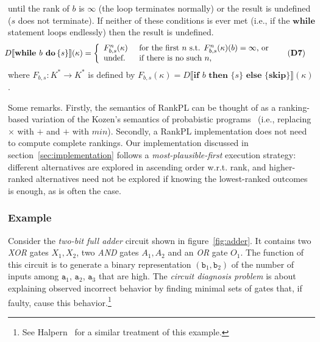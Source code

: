 \documentclass{llncs}
\newcommand{\dn}[1]{D\llbracket #1 \rrbracket}
\begin{document}
		until the rank of $b$ is $\infty$ (the loop terminates normally) or the result is undefined ($s$ does not terminate).
	If neither of these conditions is ever met (i.e., if the $\textbf{while}$ statement loops endlessly) then the result is undefined.
\begin{align}
\hspace{-5pt}\dn{\textbf{while }b\textbf{ do }\hspace{-2pt}\{ s \}}(\kappa) &=
		\left\{
			\begin{array}{ll}
				F_{b,s}^{n}(\kappa)	\hspace{4pt}	& \mbox{for the first }n\mbox{ s.t. }F_{b,s}^{n}(\kappa)(b) = \infty \mbox{, or }\\
				\mbox{undef.}		& \mbox{if there is no such }n,
			\end{array}\hspace{-5pt}\tag{\textbf{D7}}
		\right.
\end{align}
where $F_{b,s}: K^{*} \rightarrow K^{*}$ is defined by $F_{b,s}(\kappa) = \dn{\textbf{if }b\textbf{ then }\{ s \}\textbf{ else } \{ \textbf{skip} \}}(\kappa)$.

Some remarks.
Firstly, the semantics of RankPL can be thought of as a ranking-based variation of the 
	Kozen's semantics of probabistic programs~\cite{DBLP:journals/jcss/Kozen81} (i.e., replacing $\times$ with $+$ and $+$ with $min$).
Secondly, a RankPL implementation does not need to compute complete rankings.
Our implementation discussed in section~\ref{sec:implementation} follows a \emph{most-plausible-first} execution strategy:
	different alternatives are explored in ascending order w.r.t. rank,
	and higher-ranked alternatives need not be explored if knowing the lowest-ranked outcomes is enough, 
	as is often the case.

\subsubsection{Example}

Consider the \emph{two-bit full adder} circuit shown in figure~\ref{fig:adder}.
It contains two \emph{XOR} gates $X_1, X_2$, two \emph{AND} gates $A_1, A_2$ and an \emph{OR} gate $O_1$.
The function of this circuit is to generate a binary representation $(\texttt{b}_1,\texttt{b}_2)$ 
	of the number of inputs among $\texttt{a}_1$, $\texttt{a}_2$, $\texttt{a}_3$ that are high.
The \emph{circuit diagnosis problem} is about explaining observed incorrect behavior by finding minimal sets of gates that, if faulty, cause this behavior.\footnote{See Halpern~\cite[Chapter~9]{DBLP:books/daglib/0014219} for a similar treatment of this example.}
\end{document}

